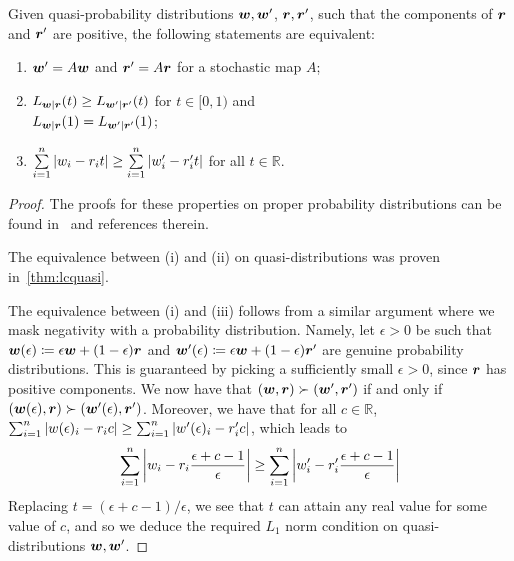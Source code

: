 \documentclass[pra,
aps,
twocolumn,
superscriptaddress,
groupedaddress,
nofootinbib,
reprint
]{revtex4-1}
\begin{document}
\begin{proposition}\label{prop:rmajor}
Given quasi-probability distributions $\boldsymbol{w}, \boldsymbol{w}'$, $\boldsymbol{r} , \boldsymbol{r}'$, such that the components of $\boldsymbol{r}$ and $\boldsymbol{r}'$ are positive, the following statements are equivalent:
  \begin{enumerate}
    \item[(i)] $\boldsymbol{w}' = A\boldsymbol{w}$ and $\boldsymbol{r}' = A\boldsymbol{r}$ for a stochastic map $A$;
    \item[(ii)] $L_{\boldsymbol{w}|\boldsymbol{r}}(t) \geq L_{\boldsymbol{w}'|\boldsymbol{r}'}(t)$ for $t\in [0,1)$ and \vspace{5pt}\\ $L_{\boldsymbol{w}|\boldsymbol{r}}(1) = L_{\boldsymbol{w}'|\boldsymbol{r}'}(1)$;
    \item[(iii)] $\sum\limits_{i=1}^n \abs{w_i - r_i t} \geq \sum\limits_{i=1}^n \abs{w'_i - r'_i t}$ for all $t \in \mathbb{R}$.
  \end{enumerate}
\end{proposition}
\begin{proof}
	The proofs for these properties on proper probability distributions can be found in~\cite{cit:marshall,ruch_mixing_1978,Renes_2016,Buscemi_2017} and references therein.
	
	The equivalence between (i) and (ii) on quasi-distributions was proven in~\cref{thm:lcquasi}.
	
	The equivalence between (i) and (iii) follows from a similar argument where we mask negativity with a probability distribution.
	Namely, let $\epsilon > 0$ be such that $\boldsymbol{w}(\epsilon) \coloneqq \epsilon \boldsymbol{w} + (1-\epsilon) \boldsymbol{r}$ and $\boldsymbol{w}'(\epsilon) \coloneqq \epsilon \boldsymbol{w} + (1-\epsilon) \boldsymbol{r}'$ are genuine probability distributions. This is guaranteed by picking a sufficiently small $\epsilon > 0$, since $\boldsymbol{r}$ has positive components. We now have that $(\boldsymbol{w} , \boldsymbol{r}) \succ (\boldsymbol{w}', \boldsymbol{r}')$ if and only if $(\boldsymbol{w}(\epsilon) , \boldsymbol{r}) \succ (\boldsymbol{w}'(\epsilon), \boldsymbol{r}')$.
	Moreover, we have that for all $c \in \mathbb{R}$, $\sum_{i=1}^n \abs{w(\epsilon)_i - r_i c} \geq \sum_{i=1}^n \abs{w'(\epsilon)_i - r'_i c}$, which leads to
	\begin{align*}
		\sum\limits_{i=1}^n \abs{w_i - r_i \frac{\epsilon + c - 1}{\epsilon}} \geq \sum\limits_{i=1}^n \abs{w'_i - r'_i \frac{\epsilon + c - 1}{\epsilon}}
	\end{align*}
Replacing $t = (\epsilon + c - 1)/\epsilon$, we see that $t$ can attain any real value for some value of $c$, and so we deduce the required $L_1$ norm condition on quasi-distributions $\boldsymbol{w}, \boldsymbol{w}'$.
\end{proof}
\end{document}
